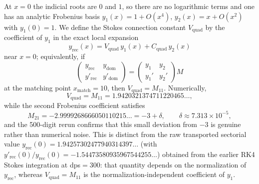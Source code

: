 At $x=0$ the indicial roots are $0$ and $1$, so there are no logarithmic terms and one has an analytic Frobenius basis $y_1(x)=1+O(x^4)$, $y_2(x)=x+O(x^2)$ with $y_1(0)=1$. We define the Stokes connection constant $V_{\mathrm{quad}}$ by the coefficient of $y_1$ in the exact local expansion
\[
  y_{\mathrm{rec}}(x)=V_{\mathrm{quad}}\,y_1(x)+C_{\mathrm{quad}}\,y_2(x)
\]
near $x=0$; equivalently, if
\[
  \begin{pmatrix} y_{\mathrm{rec}} & y_{\mathrm{dom}} \\ y'_{\mathrm{rec}} & y'_{\mathrm{dom}} \end{pmatrix}
  =
  \begin{pmatrix} y_1 & y_2 \\ y_1' & y_2' \end{pmatrix} M
\]
at the matching point $x_{\mathrm{match}}=10$, then $V_{\mathrm{quad}}=M_{11}$. Numerically,
\[
  V_{\mathrm{quad}}=M_{11}=1.9420321374711220465\ldots,
\]
while the second Frobenius coefficient satisfies
\[
  M_{21}=-2.9999268666050110215\ldots=-3+\delta,
  \qquad
  \delta\approx 7.313\times 10^{-5},
\]
and the 500-digit rerun confirms that this small deviation from $-3$ is genuine rather than numerical noise. This is distinct from the raw transported sectorial value $y_{\mathrm{rec}}(0)=1.94257302477940314397\ldots$ (with $y'_{\mathrm{rec}}(0)/y_{\mathrm{rec}}(0)=-1.54473580935967544255\ldots$) obtained from the earlier RK4 Stokes integration at dps$=300$: that quantity depends on the normalization of $y_{\mathrm{rec}}$, whereas $V_{\mathrm{quad}}=M_{11}$ is the normalization-independent coefficient of $y_1$.

